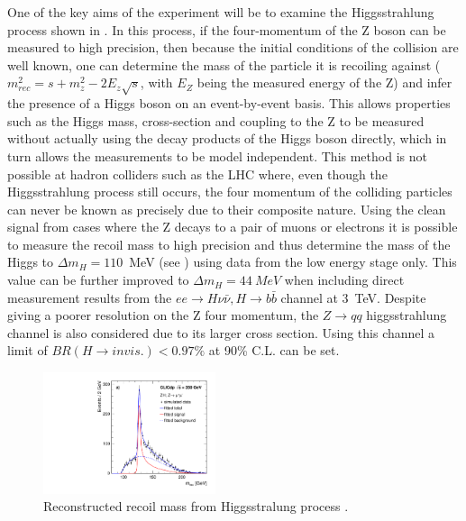 One of the key aims of the experiment will be to examine the Higgsstrahlung process shown in . In this process, if the four-momentum of the Z boson can be measured to high precision, then because the initial conditions of the collision are well known, one can determine the mass of the particle it is recoiling against ($m_{rec}^{2} = s + m_{z}^{2} - 2E_{z}\sqrt{s}$, with $E_Z$ being the measured energy of the Z) and infer the presence of a Higgs boson on an event-by-event basis. This allows properties such as the Higgs mass, cross-section and coupling to the Z to be measured without actually using the decay products of the Higgs boson directly, which in turn allows the measurements to be model independent. This method is not possible at hadron colliders such as the LHC where, even though the Higgsstrahlung process still occurs, the four momentum of the colliding particles can never be known as precisely due to their composite nature. Using the clean signal from cases where the Z decays to a pair of muons or electrons it is possible to measure the recoil mass to high precision and thus determine the mass of the Higgs to $\Delta m_{H} = 110$~MeV (see ) using data from the low energy stage only. This value can be further improved to $\Delta m_{H} = 44~MeV$ when including direct measurement results from the $ee\rightarrow H\nu\bar{\nu}, H\rightarrow b\bar{b}$ channel at 3~TeV. Despite giving a poorer resolution on the Z four momentum, the $Z\rightarrow qq$ higgsstrahlung channel is also considered due to its larger cross section. Using this channel a limit of $BR(H\rightarrow invis.) <0.97\%$ at 90\% C.L. can be set. 

\begin{figure}
  \centering
  \includegraphics[width=0.45\textwidth,keepaspectratio]{Theory/fig/350GeV_Recoil_mumuX_MrecoilFit.pdf}
  \caption[Reconstructed recoil mass from Higgsstralung process]{Reconstructed recoil mass from Higgsstralung process \cite{Abramowicz:2016zbo}.}
  \label{fig:higgsmass}
\end{figure}

